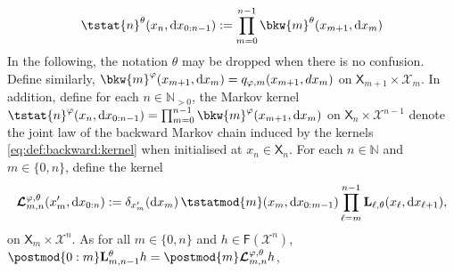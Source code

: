 \documentclass{article}
\newcommand{\Xfd}{\mathcal{X}}
\newcommand{\precpar}{\varphi}
\newcommand{\intvect}[2]{\{ #1, #2 \}}
\newcommand{\nset}{\mathbb{N}}
\newcommand{\nsetpos}{\mathbb{N}_{> 0}}
\newcommand{\1}{\mathbbm{1}}
\newcommand{\retrokmod}{\boldsymbol{\mathcal{L}}^{\precpar,\theta}}
\newcommand{\uk}[1]{\mathbf{L}_{#1}}
\newcommand{\tensprod}{\otimes}
\newcommand{\Xset}{\mathsf{X}}
\newcommand{\parvec}{\theta}
\newcommand{\bmf}[1]{\set{F}(#1)}
\newcommand{\set}[1]{\mathsf{#1}}
\newcommand{\rmd}{\ensuremath{\mathrm{d}}}
\newcommand{\eqdef}{\ensuremath{:=}}
\begin{document}
\begin{equation} \label{eq:def:tstat}
\tstat{n}^\parvec(x_n, \rmd x_{0:n - 1}) \eqdef \prod_{m = 0}^{n - 1} \bkw{m}^\parvec(x_{m + 1}, \rmd x_m)
\end{equation}
In the following, the notation $\parvec$ may be dropped when there is no confusion. Define similarly, $\bkw{m}^\varphi(x_{m + 1}, \rmd x_m) = q_{\varphi,m}(x_{m+1},dx_m)$
on $\Xset_{m + 1} \times \Xfd_m$. In addition, define for each $n \in \nsetpos$, the Markov kernel  $\tstat{n}^\varphi(x_n, \rmd x_{0:n - 1}) = \prod_{m = 0}^{n - 1} \bkw{m}^\varphi(x_{m + 1}, \rmd x_m)$ on $\Xset_n \times \Xfd^{n - 1}$ denote the joint law of the backward Markov chain induced by the kernels \eqref{eq:def:backward:kernel} when initialised at $x_n \in \Xset_n$. %
    For each $n \in \nset$ and $m \in \intvect{0}{n}$, define the kernel  
\begin{equation} \label{eq:def:retrokmod}
    \retrokmod_{m, n}(x_m', \rmd x_{0:n}) \eqdef \delta_{x_m'}(\rmd x_m) \, \tstatmod{m}(x_m, \rmd x_{0:m - 1}) \prod_{\ell = m}^{n - 1} \uk{\ell,\theta}(x_\ell, \rmd x_{\ell + 1}), 
\end{equation}
on $\Xset_m \times \Xfd^n$. 
As for all $m \in \intvect{0}{n}$ and $h \in \bmf{\Xfd^n}$, 
 $\postmod{0:m} \uk{m, n - 1}^\theta h = \postmod{m} \retrokmod_{m, n} h$,
\end{document}
